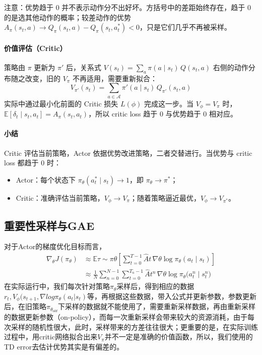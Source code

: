\documentclass[UTF8,fontset=fandol]{ctexart}
\begin{document}
注意：优势趋于 $0$ 并不表示动作分不出好坏。方括号中的差距始终存在，趋于 $0$ 的是选其他动作的概率；较差动作的优势 $A_\pi(s_t,a)\to Q_\pi(s_t,a)-Q_\pi(s_t,a_t^*)<0$，只是它们几乎不再被采样。

\paragraph{价值评估（Critic）}
策略由 $\pi$ 更新为 $\pi'$ 后，关系式 $V(s_t)=\sum_a\pi(a\mid s_t)\,Q(s_t,a)$ 右侧的动作分布随之改变，旧的 $V_\pi$ 不再适用，需要重新拟合：
\[
V_{\pi'}(s_t)=\sum_{a\in\mathcal{A}}\pi'(a\mid s_t)\,Q_{\pi'}(s_t,a)
\]
实际中通过最小化前面的 Critic 损失 $L(\phi)$ 完成这一步。当 $V_\phi=V_\pi$ 时，$\mathbb{E}\left[\delta_t\mid s_t,a_t\right]=A_\pi(s_t,a_t)$，所以 critic loss 趋于 $0$ 与优势趋于 $0$ 相对应。

\paragraph{小结}
Critic 评估当前策略，Actor 依据优势改进策略，二者交替进行。当优势与 critic loss 都趋于 $0$ 时：
\begin{itemize}
  \item Actor：每个状态下 $\pi_\theta(a_t^*\mid s_t)\to 1$，即 $\pi_\theta\to\pi^*$；
  \item Critic：准确评估当前策略，$V_\phi\to V_\pi$；随着策略逼近最优，$V_\phi\to V_{\pi^*}$。
\end{itemize}

\subsection{重要性采样与GAE}
对于Actor的梯度优化目标而言，
\begin{align*}
\nabla_\theta J(\pi_\theta)
&\approx\mathbb{E}{\tau\sim\pi\theta}\left[\sum_{t=0}^{T-1}\hat{A}t\,\nabla\theta\log\pi_\theta(a_t\mid s_t)\right]\\
&\approx\frac{1}{N}\sum_{n=0}^{N-1}\sum_{t=0}^{T_n-1}\hat{A}t^{n}\,\nabla\theta\log\pi_\theta\big(a_t^{n}\mid s_t^{n}\big)
\end{align*}
在实际运行中，我们每次针对策略\(\pi_\theta\)采样后，得到相应的数据\(r_t,V_\phi(s_{t+1},\nabla log\pi_\theta(a_t|s_t)\)等，再根据这些数据，带入公式并更新参数，参数更新后，在旧策略\(\pi_{\theta_{old}}\)下采样的数据就不能使用了，需要重新采样数据，再由重新采样的数据更新参数（on-policy），而每一次重新采样会带来较大的资源消耗，由于每次采样的随机性很大，此时，采样带来的方差往往很大；更重要的是，在实际训练过程中，用critic网络拟合出来\(V_\pi\)并不一定是准确的价值函数，所以，我们使用的TD error去估计优势其实是有偏差的。
\end{document}
